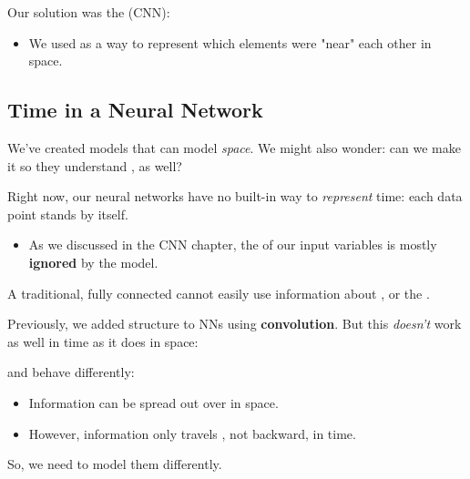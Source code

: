         Our solution was the  (CNN): 
        \begin{itemize}
            \item We used  as a way to represent which elements were "near" each other in space.
        \end{itemize}




    \phantom{}
        
    \subsection{Time in a Neural Network}
    
        We've created models that can model \textit{space}. We might also wonder: can we make it so they understand , as well?

        Right now, our neural networks have no built-in way to \textit{represent} time: each data point stands by itself.

        \begin{itemize}
            \item As we discussed in the CNN chapter, the  of our input variables is mostly \textbf{ignored} by the model.\\
        \end{itemize}

        \begin{concept}
            A traditional, fully connected  cannot easily use information about , or the .
        \end{concept}

        Previously, we added structure to NNs using \textbf{convolution}. But this \textit{doesn't} work as well in time as it does in space:\\

        \begin{concept}
             and  behave differently:
            
            \begin{itemize}
                \item Information can be spread out over  in space.
                \item However, information only travels , not backward, in time.
            \end{itemize}

            So, we need to model them differently.
        \end{concept}
        
